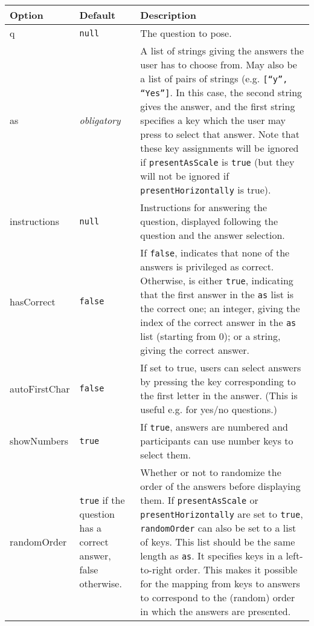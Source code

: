 \documentclass[11pt,letterpaper]{article}
\begin{document}
\footnotesize
\begin{RaggedRight}
\sloppy
\begin{tabular}{|p{1.0168in}|p{1.0154in}|p{3.4677in}|}
\hline
 \textbf{Option}        &  \textbf{Default}     &  \textbf{Description}                                                     \\
\hline
 q               &  \texttt{null}        &  The question to pose.                                             \\
\hline
 as              & \textit{ obligatory}   &  A list of strings giving the answers the user has to choose from. May also be a list of pairs of strings (e.g. \texttt{{[}``y'', ``Yes''{]}}. In this case, the second string gives the answer, and the first string specifies a key which the user may press to select that answer. Note that these key assignments will be ignored if \texttt{presentAsScale} is \texttt{true} (but they will not be ignored if \texttt{presentHorizontally} is true). \\
\hline
 instructions    &  \texttt{null}        &  Instructions for answering the question, displayed following the question and the answer selection. \\
\hline
 hasCorrect      &  \texttt{false}       &  If \texttt{false}, indicates that none of the answers is privileged as correct. Otherwise, is either \texttt{true}, indicating that the first answer in the \texttt{as} list is the correct one; an integer, giving the index of the correct answer in the \texttt{as} list (starting from 0); or a string, giving the correct answer. \\
\hline
 autoFirstChar   &  \texttt{false}       &  If set to true, users can select answers by pressing the key corresponding to the first letter in the answer. (This is useful e.g. for yes/no questions.) \\
\hline
 showNumbers     &  \texttt{true}        &  If \texttt{true}, answers are numbered and participants can use number keys to select them. \\
\hline
 randomOrder     &  \texttt{true} if the question has a correct answer, false otherwise.  &  Whether or not to randomize the order of the answers before displaying them. If \texttt{presentAsScale} or \texttt{presentHorizontally} are set to \texttt{true}, \texttt{randomOrder} can also be set to a list of keys. This list should be the same length as \texttt{as}. It specifies keys in a left-to-right order. This makes it possible for the mapping from keys to answers to correspond to the (random) order in which the answers are presented. \\

\end{tabular}
\end{RaggedRight}
\end{document}

